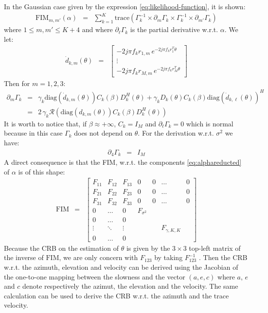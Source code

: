 \documentclass[a4paper, 12pt]{report}
\newcommand{\diag}[1]{\mathrm{diag}\left( #1 \right)}
\newcommand{\trace}[1]{\mathrm{trace}\left( #1 \right)}
\def\fim{\mathrm{FIM}}
\begin{document}
 \bigskip
In the Gaussian case given by the expression \eqref{eq:likelihood-function}, it is shown:
\begin{eqnarray}
 \label{eq:FIMgaussian}
\fim_{m,m'}(\alpha)&=&\sum_{k=1}^{K}\trace{\Gamma_{k}^{-1}\times\partial_{m}\Gamma_{k}\times\Gamma_{k}^{-1}\times\partial_{m'}\Gamma_{k}}
\end{eqnarray}
where $1\leq m,m'\leq K+4$ and where $\partial_{\ell}\Gamma_{k}$ is the partial derivative w.r.t. $\alpha$.   We let:
\begin{eqnarray*}
 \dot d_{k,m}(\theta)&=&
  \begin{bmatrix}
  -2j\pi f_{k} r_{1,m}\,e^{-2j\pi f_{k}r_{1}^{T}\theta}
  \\
  \vdots
  \\
  -2j\pi f_{k} r_{M,m}\,e^{-2j\pi f_{k}r_{M}^{T}\theta}
  \end{bmatrix}
\end{eqnarray*}
Then for $m=1,2,3$:
\begin{eqnarray*}
\partial_{m}\Gamma_{k}&=&
   \gamma_{k}\diag{ \dot d_{k,m}(\theta)}C_{k}(\beta)D_{k}^{H}(\theta)+
   \gamma_{k} D_{k}(\theta)C_{k}(\beta) \diag{ \dot d_{k,\ell}(\theta)}^{H}
   \\
   &=&2\, \gamma_{k} \mathcal{R}\left(
   \diag{d_{k,m}(\theta)}C_{k}(\beta)D_{k}^{H}(\theta)\right)
\end{eqnarray*}
It is worth to notice that, if $\beta\approx +\infty$, $C_{k}=I_{M}$ and $\partial_{\ell}\Gamma_{k}=0$ which is normal because in this case $\Gamma_{k}$ does not depend on $\theta$. For the derivation w.r.t. $\sigma^{2}$ we have:
\begin{eqnarray*}
\partial_{4}\Gamma_{k}&=&I_{M}
\end{eqnarray*}
A direct consequence is that the FIM, w.r.t. the components \eqref{eq:alphareducted} of $\alpha$ is of this shape:
\begin{eqnarray*}
 \fim&=&\begin{bmatrix}
 F_{11}&F_{12}&F_{13}&0&0&\ldots&0
 \\
 F_{21}&F_{22}&F_{23}&0&0&\ldots&0
 \\
F_{31}&F_{32}&F_{33}&0&0&\ldots&0
 \\
0&\ldots&0&F_{\sigma^{2}}&
 \\
0&\ldots&0&&
\\
\vdots&\ddots&\vdots&&&F_{\gamma,K,K}
\\
0&\ldots&0
 \end{bmatrix}
\end{eqnarray*}
Because the CRB on the estimation of $\theta$ is given by the $3\times 3$ top-left matrix of the inverse of $\fim$, we are only concern with $ F_{123}$ by taking $ F_{123}^{-1}$ . Then the CRB w.r.t. the azimuth, elevation and velocity can be derived using the Jacobian of the one-to-one mapping between the slowness and the vector $(a,e,c)$ where $a$, $e$ and $c$ denote respectively the azimut, the elevation and the velocity. The same calculation can be used to derive the CRB w.r.t. the azimuth and the trace velocity.
\end{document}
